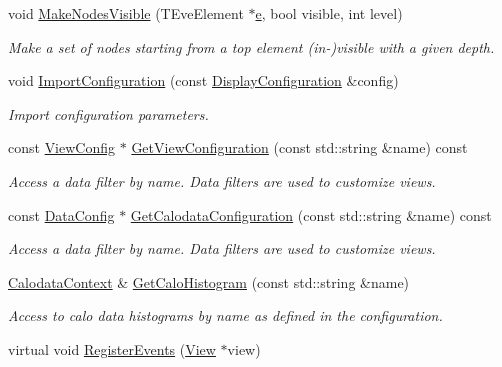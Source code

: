 \begin{DoxyCompactItemize}
void \hyperlink{class_d_d4hep_1_1_display_a7d6adb53b1895ebb1133b4e5bbb1d6d4}{Make\+Nodes\+Visible} (T\+Eve\+Element $\ast$\hyperlink{_volumes_8cpp_a8a9a1f93e9b09afccaec215310e64142}{e}, bool visible, int level)
\begin{DoxyCompactList}\small\item\em Make a set of nodes starting from a top element (in-\/)visible with a given depth. \end{DoxyCompactList}\item 
void \hyperlink{class_d_d4hep_1_1_display_a3dfe74c5f4b7f1547ccf07ccba8b6d39}{Import\+Configuration} (const \hyperlink{class_d_d4hep_1_1_display_configuration}{Display\+Configuration} \&config)
\begin{DoxyCompactList}\small\item\em Import configuration parameters. \end{DoxyCompactList}\item 
const \hyperlink{class_d_d4hep_1_1_display_a7be76e4de32d9d1084a6ca2f52669f68}{View\+Config} $\ast$ \hyperlink{class_d_d4hep_1_1_display_ad73365feb14a5e6c5b493f3e78ce2e2b}{Get\+View\+Configuration} (const std\+::string \&name) const
\begin{DoxyCompactList}\small\item\em Access a data filter by name. Data filters are used to customize views. \end{DoxyCompactList}\item 
const \hyperlink{class_d_d4hep_1_1_display_a79237f24a5b3ec781faa5f8e20579ae0}{Data\+Config} $\ast$ \hyperlink{class_d_d4hep_1_1_display_adb46b500424decc7f41300e8995de11f}{Get\+Calodata\+Configuration} (const std\+::string \&name) const
\begin{DoxyCompactList}\small\item\em Access a data filter by name. Data filters are used to customize views. \end{DoxyCompactList}\item 
\hyperlink{struct_d_d4hep_1_1_display_1_1_calodata_context}{Calodata\+Context} \& \hyperlink{class_d_d4hep_1_1_display_a165b8f80e13b8428ec01bde1878f7d0e}{Get\+Calo\+Histogram} (const std\+::string \&name)
\begin{DoxyCompactList}\small\item\em Access to calo data histograms by name as defined in the configuration. \end{DoxyCompactList}\item 
virtual void \hyperlink{class_d_d4hep_1_1_display_ab1c06999ce5655dc960771f8082a1710}{Register\+Events} (\hyperlink{class_d_d4hep_1_1_view}{View} $\ast$view)

\end{DoxyCompactItemize}
